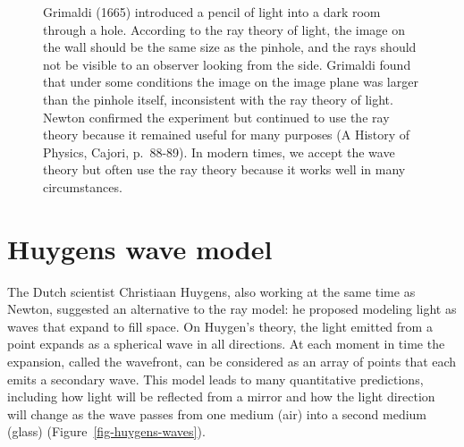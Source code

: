 \documentclass[
  letterpaper,
]{book}
\begin{document}
\begin{figure}


\caption{\label{fig-ray-wave}Grimaldi (1665) introduced a pencil of
light into a dark room through a hole. According to the ray theory of
light, the image on the wall should be the same size as the pinhole, and
the rays should not be visible to an observer looking from the side.
Grimaldi found that under some conditions the image on the image plane
was larger than the pinhole itself, inconsistent with the ray theory of
light. Newton confirmed the experiment but continued to use the ray
theory because it remained useful for many purposes (A History of
Physics, Cajori, p.~88-89). In modern times, we accept the wave theory
but often use the ray theory because it works well in many
circumstances.}

\end{figure}%

\section{Huygens wave model}\label{sec-huygens-wave}

The Dutch scientist Christiaan Huygens, also working at the same time as
Newton, suggested an alternative to the ray model: he proposed modeling
light as waves that expand to fill space. On Huygen's theory, the light
emitted from a point expands as a spherical wave in all directions. At
each moment in time the expansion, called the wavefront, can be
considered as an array of points that each emits a secondary wave. This
model leads to many quantitative predictions, including how light will
be reflected from a mirror and how the light direction will change as
the wave passes from one medium (air) into a second medium (glass)
(Figure~\ref{fig-huygens-waves}).
\end{document}
